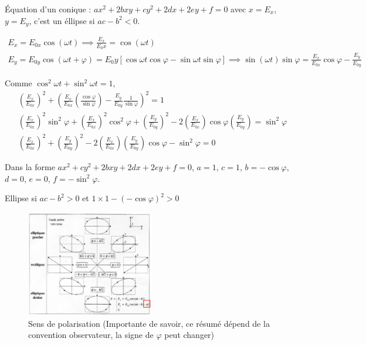\begin{myproof}
Équation d'un conique : $ax^{2}+2bxy+cy^{2}+2dx+2ey+f=0$ avec $x = E_x$, $y=E_y$, c'est un éllipse si $ac-b^{2}<0$.

\begin{gather*}
    E_x = E_{0 x} \cos ( \omega t) \implies \frac{E_x}{E_0x}  = \cos( \omega t) \\
    E_y = E_{0y} \cos ( \omega t+\varphi) = E_0y [\cos \omega t \cos \varphi - \sin \omega t \sin \varphi] \implies \sin (\omega t) \sin \varphi = \frac{E_x}{E_{0x}} \cos \varphi - \frac{E_y}{E_{0y}}  
\end{gather*}

Comme $\cos^{2} \omega t+ \sin ^{2} \omega t = 1$,
\begin{gather*}
    \left( \frac{E_x}{E_{0x}}  \right) ^{2}  + \left( \frac{E_x}{E_{0x}} \left( \frac{\cos \varphi}{\sin \varphi}  \right)- \frac{E_y}{E_{0y}} \frac{1}{\sin \varphi}    \right) ^{2} = 1 \\
    \left( \frac{E_x}{E_{0x}}  \right) ^{2} \sin ^{2} \varphi + \left( \frac{E_x}{E_{0x}}  \right) ^{2} \cos^{2}\varphi + \left( \frac{E_y}{E_{0y}}  \right) ^{2} - 2 \left( \frac{E_x}{E_{0x}}  \right)  \cos \varphi \left( \frac{E_y}{E_{0y}}  \right)  = \sin ^{2}\varphi \\
    \left( \frac{E_x}{E_{0x}}  \right) ^{2} + \left( \frac{E_y}{E_{0y}}  \right)  ^{2} - 2 \left( \frac{E_x}{E_{0x}}  \right) \left( \frac{E_y}{E_{0y}}  \right)  \cos \varphi - \sin ^{2} \varphi=0
\end{gather*}

Dans la forme $ax^{2}+cy^{2}+ 2bxy+2dx+2ey+f = 0$, $a=1$,  $c=1$,  $b = -\cos \varphi$,  $d=0$,  $e=0$,  $f = - \sin ^{2}\varphi$.


Ellipse si $ac-b^{2}>0$ et $1\times 1 - (-\cos \varphi)^{2} >0$

\end{myproof}

\begin{figure}[H] %
    \centering
    \includegraphics[width=0.5\textwidth]{./assets/Sens de polarisation.png}
    \caption{Sens de polarisation (Importante de savoir, ce résumé dépend de la convention observateur, la signe de $\varphi$ peut changer)}
    \label{fig:Sens-de-polarisation}
\end{figure}

